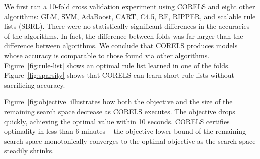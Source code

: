 We first ran a 10-fold cross validation experiment using CORELS and eight other algorithms:
GLM, SVM, AdaBoost, CART, C4.5, RF, RIPPER, and scalable rule lists (SBRL).
There were no statistically significant differences in the accuracies of the
algorithms. In fact, the difference between folds was far larger than the difference
between algorithms. We conclude that CORELS produces models whose accuracy is comparable
to those found via other algorithms.
%
Figure~\ref{fig:rule-list} shows an optimal rule list learned in one of the folds.
%
Figure~\ref{fig:sparsity} shows that CORELS can learn short rule lists without
sacrificing accuracy.

Figure~\ref{fig:objective} illustrates how both the objective and the size of
the remaining search space decrease as CORELS executes.
The objective drops quickly, achieving the optimal value within 10 seconds.
CORELS certifies optimality in less than 6 minutes --
the objective lower bound of the remaining search space
monotonically converges to the optimal objective
as the search space steadily shrinks.

